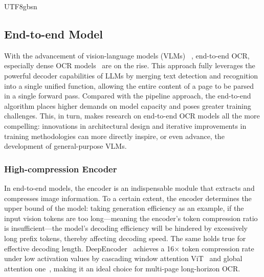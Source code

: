\documentclass[11pt, a4paper, logo, copyright, nonumbering]{deepseek}
\begin{document}
\begin{CJK*}{UTF8}{gbsn}
\subsection{End-to-end Model}
With the advancement of vision-language models (VLMs)~\cite{li2023blip,Qwen-VL,Qwen2.5-VL,wei2024vary,huang2026step3} , end-to-end OCR, especially dense OCR models~\cite{blecher2023nougat,wei2024general,wei2025deepseek,wei2026deepseek,dots,poznanski2025olmocr} are on the rise. This approach fully leverages the powerful decoder capabilities of LLMs by merging text detection and recognition into a single unified function, allowing the entire content of a page to be parsed in a single forward pass. Compared with the pipeline approach, the end-to-end algorithm places higher demands on model capacity and poses greater training challenges. This, in turn, makes research on end-to-end OCR models all the more compelling: innovations in architectural design and iterative improvements in training methodologies can more directly inspire, or even advance, the development of general-purpose VLMs. 



\subsubsection{High-compression Encoder}
In end-to-end models, the encoder is an indispensable module that extracts and compresses image information. To a certain extent, the encoder determines the upper bound of the model: taking generation efficiency as an example, if the input vision tokens are too long—meaning the encoder's token compression ratio is insufficient—the model's decoding efficiency will be hindered by excessively long prefix tokens, thereby affecting decoding speed. The same holds true for effective decoding length. DeepEncoder~\cite{wei2025deepseek} achieves a 16$\times$ token compression rate under low activation values by cascading window attention ViT~\cite{kirillov2023segment} and global attention one~\cite{radford2021learning}, making it an ideal choice for multi-page long-horizon OCR. 


\end{CJK*}
\end{document}
